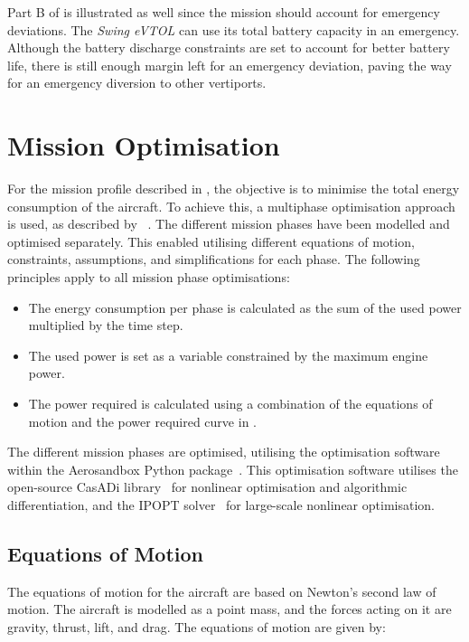 Part B of  is illustrated as well since the mission should account for emergency deviations.
The \textit{Swing eVTOL} can use its total battery capacity in an emergency.
Although the battery discharge constraints are set to account for better battery life, there is still enough margin left for an emergency deviation,
paving the way for an emergency diversion to other vertiports.


\section{Mission Optimisation}\label{sec:mission_optimisation}
For the mission profile described in , the objective is to minimise the total energy consumption of the aircraft.
To achieve this, a multiphase optimisation approach is used, as described by \citeauthor{traj_opt}~\cite{traj_opt}.
The different mission phases have been modelled and optimised separately.
This enabled utilising different equations of motion, constraints, assumptions, and simplifications for each phase.
The following principles apply to all mission phase optimisations:


\begin{itemize}
    \item The energy consumption per phase is calculated as the sum of the used power multiplied by the time step.
    \item The used power is set as a variable constrained by the maximum engine power.
    \item The power required is calculated using a combination of the equations of motion
    and the power required curve in .
\end{itemize}


The different mission phases are optimised, utilising the optimisation software within the Aerosandbox Python package~\cite{aerosandbox}.
This optimisation software utilises the open-source CasADi library~\cite{casadi} for nonlinear optimisation and algorithmic differentiation,
and the IPOPT solver~\cite{IPOPT} for large-scale nonlinear optimisation.

\subsection{Equations of Motion}\label{subsec:equations_of_motion}
The equations of motion for the aircraft are based on Newton's second law of motion.
The aircraft is modelled as a point mass, and the forces acting on it are gravity, thrust, lift, and drag.
The equations of motion are given by:

